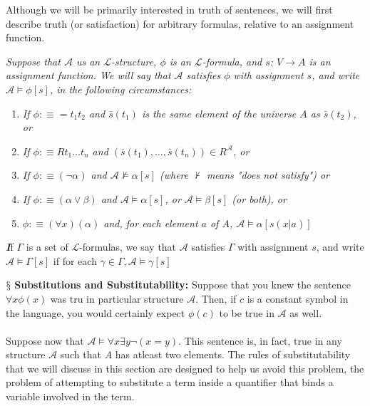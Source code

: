\documentclass[10pt,a4paper]{article}
\newenvironment{callout}
	{\begin{calloutbox}\color{charcoal}\textbf\textit}
	{\end{calloutbox}}
\newcommand{\newpoint}[1]{\indent$\mathsection$ \textbf{#1}}
\newcommand{\curveL}{\mathcal{L}}
\newcommand{\curveA}{\mathcal{A}}
\begin{document}
                    Although we will be primarily interested in truth of sentences, we will
                    first describe truth (or satisfaction) for arbitrary formulas, relative to an
                    assignment function.
                    \begin{define}
                        \textit{Suppose that $\curveA$ us an $\curveL$-structure, $\phi$ is an $\curveL$-formula, and $s$: $V\rightarrow A$ is an assignment function. We will say that $\curveA$ satisfies $\phi$ with assignment $s$, and write $\curveA\vDash \phi[s]$, in the following circumstances:}
                        \begin{enumerate}
                            \item \textit{If $\phi :\equiv =t_1t_2$ and $\bar s(t_1)$ is the same element of the universe $A$ as $\bar s(t_2)$, or}
                            \item \textit{If $\phi :\equiv Rt_1\dots t_n$ and $(\bar s(t_1),\dots,\bar s(t_n))\in R^\curveA$, or}
                            \item \textit{If $\phi:\equiv (\neg \alpha)$ and $\curveA \not\vDash \alpha[s]$ (where $\not\vdash$ means "does not satisfy") or}
                            \item \textit{If $\phi:\equiv (\alpha\lor\beta)$ and $\curveA\vDash\alpha[s]$, or $\curveA \vDash\beta[s]$ (or both), or}
                            \item \textit{$\phi:\equiv(\forall x)(\alpha)$ and, for each element $a$ of $A$, $\curveA\vDash \alpha[s(x|a)]$}
                        \end{enumerate}
                    \end{define}
                    \begin{callout}
                        If $\Gamma$ is a set of $\curveL$-formulas, we say that $\curveA$ satisfies $\Gamma$ with assignment $s$, and write $\curveA\vDash \Gamma[s]$ if for each $\gamma\in\Gamma, \curveA\vDash \gamma[s]$
                    \end{callout}
                    \newpoint{Substitutions and Substitutability:} Suppose that you knew the sentence $\forall x \phi(x)$ was tru in particular structure $\curveA$. Then, if $c$ is a constant symbol in the language, you would certainly expect $\phi(c)$ to be true in $\curveA$ as well.
                    \\
                    \\
                    Suppose now that $\curveA\vDash \forall x\exists y\neg(x=y)$. This sentence is, in fact, true in any structure $\curveA$ such that $A$ has atleast two elements. The rules of substitutability that we will discuss in this section are designed to help us avoid this problem, the problem of attempting to substitute a term inside a quantifier that binds a variable involved in the term.
\end{document}
